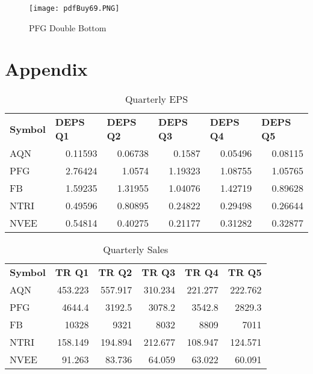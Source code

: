 \documentclass{article}
\begin{document}
\begin{figure}[h]
\centering
\texttt{[image: pdfBuy69.PNG]}
\caption{PFG Double Bottom}
\label{fig:PFG Double Bottom}
\end{figure}

\section{Appendix}
\begin{table}[htbp]
  \caption{Quarterly EPS}
   \begin{tabular}{lrrrrr}
    \textbf{Symbol} & \multicolumn{1}{l}{\textbf{DEPS Q1}} & \multicolumn{1}{l}{\textbf{DEPS Q2}} & \multicolumn{1}{l}{\textbf{DEPS Q3}} & \multicolumn{1}{l}{\textbf{DEPS Q4}} & \multicolumn{1}{l}{\textbf{DEPS Q5}} \\
    AQN   & 0.11593 & 0.06738 & 0.1587 & 0.05496 & 0.08115 \\
    PFG   & 2.76424 & 1.0574 & 1.19323 & 1.08755 & 1.05765 \\
    FB    & 1.59235 & 1.31955 & 1.04076 & 1.42719 & 0.89628 \\
    NTRI  & 0.49596 & 0.80895 & 0.24822 & 0.29498 & 0.26644 \\
    NVEE  & 0.54814 & 0.40275 & 0.21177 & 0.31282 & 0.32877 \\
    \end{tabular}%
  \label{tab:addlabel}%
\end{table}%


\begin{table}[htbp]
  \caption{Quarterly Sales}
    \begin{tabular}{lrrrrr}
    \textbf{Symbol} & \multicolumn{1}{l}{\textbf{TR Q1}} & \multicolumn{1}{l}{\textbf{TR Q2}} & \multicolumn{1}{l}{\textbf{TR Q3}} & \multicolumn{1}{l}{\textbf{TR Q4}} & \multicolumn{1}{l}{\textbf{TR Q5}} \\
    AQN   & 453.223 & 557.917 & 310.234 & 221.277 & 222.762 \\
    PFG   & 4644.4 & 3192.5 & 3078.2 & 3542.8 & 2829.3 \\
    FB    & 10328 & 9321  & 8032  & 8809  & 7011 \\
    NTRI  & 158.149 & 194.894 & 212.677 & 108.947 & 124.571 \\
    NVEE  & 91.263 & 83.736 & 64.059 & 63.022 & 60.091 \\
    \end{tabular}%
  \label{tab:addlabel}%
\end{table}%
\end{document}
